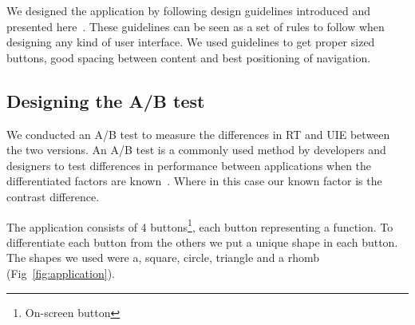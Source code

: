 \documentclass[runningheads,a4paper]{llncs}
\begin{document}
We designed the application by following design guidelines introduced and presented here~\cite{hoober2011designing,johnson2013designing,gong2004guidelines,norman2013design}. These guidelines can be seen as a set of rules to follow when designing any kind of user interface. We used guidelines to get proper sized buttons, good spacing between content and best positioning of navigation.

\subsection{Designing the A/B test}
We conducted an A/B test to measure the differences in RT and UIE between the two versions. An A/B test is a commonly used method by developers and designers to test differences in performance between applications when the differentiated factors are known~\cite{johnson2013designing}. Where in this case our known factor is the contrast difference. 

The application consists of 4 buttons\footnote{On-screen button}, each button representing a function. To differentiate each button from the others we put a unique shape in each button. The shapes we used were a, square, circle, triangle and a rhomb (Fig~\ref{fig:application}).
\end{document}
